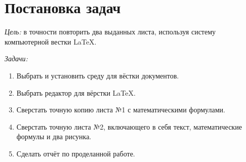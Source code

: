 \documentclass[a4paper, final]{article}
\begin{document}


{
\section{Постановка задач}
\par \textit{Цель:} в точности повторить два выданных листа, используя систему компьютерной вестки \LaTeX. \\
\par \textit{Задачи:}
\begin{enumerate}
    \item Выбрать и установить среду для вёстки документов.
    \item Выбрать редактор для вёрстки \LaTeX.
    \item Сверстать точную копию листа №1 с математическими формулами.
    \item Сверстать точную листа №2, включающего в себя текст, математические формулы и два рисунка.
    \item Сделать отчёт по проделанной работе.
\end{enumerate}
\newpage
}
\end{document}
